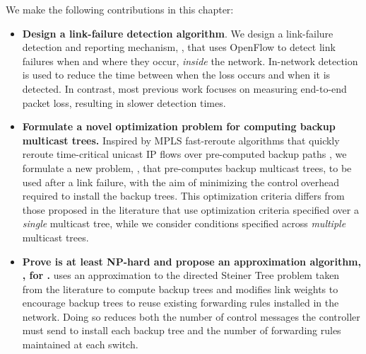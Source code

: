


We make the following contributions in this chapter: 
\begin{itemize}

	\item {\bf Design a link-failure detection algorithm}. 
	We design a link-failure detection and reporting mechanism, \pcnts, that uses OpenFlow \cite{OpenFlow08}  
	to detect link failures when and where they occur, \emph{inside} the network.  In-network detection is used to reduce the 
	time between when the loss occurs and when it is detected. In contrast, most previous work \cite{Almes99,Caceres99,Friedl09} focuses on measuring end-to-end packet loss, 
	resulting in slower detection times. 


	\item {\bf Formulate a novel optimization problem for computing backup multicast trees.} 
	Inspired by MPLS fast-reroute algorithms that quickly reroute time-critical unicast IP flows over pre-computed backup paths \cite{Rosen01}, 
	we formulate a new problem, \mcs, that pre-computes backup multicast trees, to be used after a link failure, with the aim 
	of minimizing the control overhead required to install the backup trees. 
	 This optimization criteria differs from those proposed in the literature \cite{Cui04,Fei01,Medard99,Pointurier02,Wu97} that use optimization
 	criteria specified over a \emph{single} multicast tree, while we consider conditions specified across \emph{multiple} multicast trees. 

	\item {\bf Prove \mc is at least NP-hard and propose an approximation algorithm, \steiners, for \mcs.} 
	\steiner uses an approximation to the directed Steiner Tree problem taken from the literature \cite{Charikar98} to compute backup trees and modifies link weights to 
	encourage backup trees to reuse existing forwarding rules installed in the network. Doing so reduces both the number of control messages the controller must send to install each backup tree
	and the number of forwarding rules maintained at each switch.


\end{itemize}
